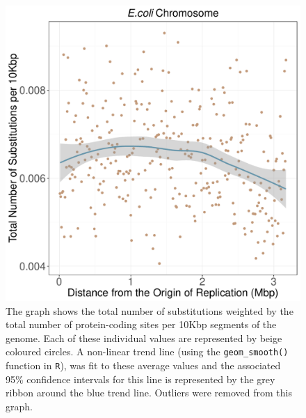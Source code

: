 \documentclass[11pt]{article}
\begin{document}
\begin{figure}[h]
	\begin{center}
		\includegraphics[width=\textwidth]{./figs/ecoli_10KB_weighted_subs_nonpar_12Sep20.pdf}
		\caption{\label{fig:ecoli_nonpar}The graph shows the total number of substitutions weighted by the total number of protein-coding sites per 10Kbp segments of the genome. Each of these individual values are represented by beige coloured circles. A non-linear trend line (using the \texttt{geom\_smooth()} function in \texttt{R}), was fit to these average values and the associated 95\% confidence intervals for this line is represented by the grey ribbon around the blue trend line. Outliers were removed from this graph.}
	\end{center}
\end{figure}
\end{document}
